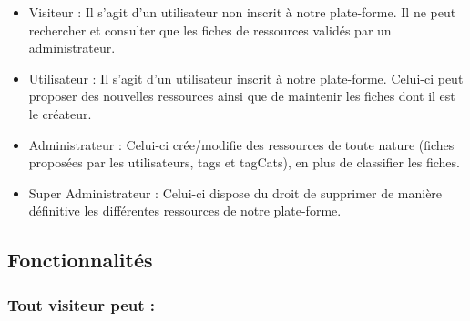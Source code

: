 \begin{itemize}
    \item Visiteur : Il s'agit d'un utilisateur non inscrit à notre plate-forme. Il ne peut rechercher et consulter que les \glspl{fiche} de ressources validés par un administrateur.
    \item Utilisateur : Il s'agit d'un utilisateur  inscrit à notre plate-forme. Celui-ci peut proposer des nouvelles ressources ainsi que de maintenir les \glspl{fiche} dont il est le créateur.
    \item Administrateur : Celui-ci crée/modifie des ressources de toute nature (\glspl{fiche} proposées par les utilisateurs, \glspl{tag} et \glspl{tagCat}), en plus de classifier les \glspl{fiche}.
    \item Super Administrateur : Celui-ci dispose du droit de supprimer de manière définitive les différentes ressources de notre plate-forme.
\end{itemize}

\subsection*{Fonctionnalités}

\subsubsection*{Tout visiteur peut : }


